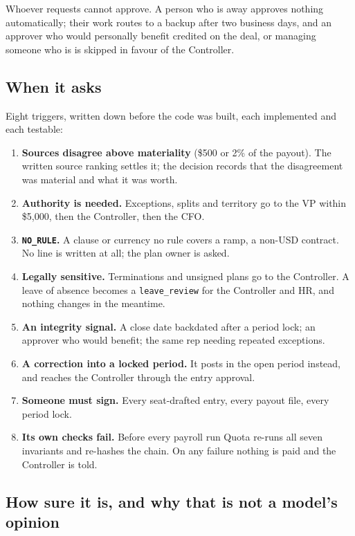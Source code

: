 \documentclass[10pt,a4paper]{article}
\newcommand{\code}[1]{{\small\texttt{#1}}}
\begin{document}
\vspace{4pt}
Whoever requests cannot approve. A person who is away approves nothing automatically; their work routes to a backup after two business days, and an approver who would personally benefit \textemdash{} credited on the deal, or managing someone who is \textemdash{} is skipped in favour of the Controller.

\subsection{When it asks}

Eight triggers, written down before the code was built, each implemented and each testable:

\begin{enumerate}[label=\textbf{\arabic*.}]
\item \textbf{Sources disagree above materiality} (\$500 or 2\% of the payout). The written source ranking settles it; the decision records that the disagreement was material and what it was worth.
\item \textbf{Authority is needed.} Exceptions, splits and territory go to the VP within \$5{,}000, then the Controller, then the CFO.
\item \textbf{\code{NO\_RULE}.} A clause or currency no rule covers \textemdash{} a ramp, a non-USD contract. No line is written at all; the plan owner is asked.
\item \textbf{Legally sensitive.} Terminations and unsigned plans go to the Controller. A leave of absence becomes a \code{leave\_review} for the Controller and HR, and nothing changes in the meantime.
\item \textbf{An integrity signal.} A close date backdated after a period lock; an approver who would benefit; the same rep needing repeated exceptions.
\item \textbf{A correction into a locked period.} It posts in the open period instead, and reaches the Controller through the entry approval.
\item \textbf{Someone must sign.} Every seat-drafted entry, every payout file, every period lock.
\item \textbf{Its own checks fail.} Before every payroll run Quota re-runs all seven invariants and re-hashes the chain. On any failure nothing is paid and the Controller is told.
\end{enumerate}

\subsection{How sure it is, and why that is not a model's opinion}
\end{document}
